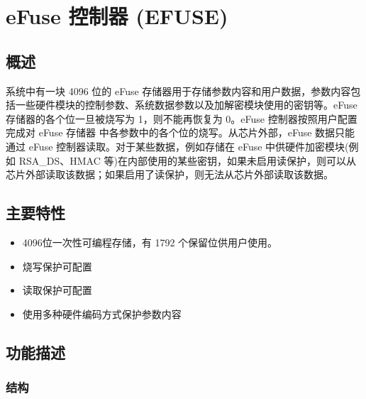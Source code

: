 \documentclass[main\_\_CN.tex]{subfiles}
\begin{document}

\ifglobal
\else
    {\let\clearpage\relax \listoftodos}
    {\let\clearpage\relax \listofdonetodos}
    \tableofcontents
\fi



\chapter{eFuse 控制器 (EFUSE)}
\label{mod:efuse}
\hypertarget{efuse}{}

\section{概述}

\chipname{} 系统中有一块 4096 位的 eFuse 存储器用于存储参数内容和用户数据，参数内容包括一些硬件模块的控制参数、系统数据参数以及加解密模块使用的密钥等。eFuse 存储器的各个位一旦被烧写为 1，则不能再恢复为 0。eFuse 控制器按照用户配置完成对 eFuse 存储器 中各参数中的各个位的烧写。从芯片外部，eFuse 数据只能通过 eFuse 控制器读取。对于某些数据，例如存储在 eFuse 中供硬件加密模块(例如 RSA\_DS、HMAC 等)在内部使用的某些密钥，如果未启用读保护，则可以从芯片外部读取该数据；如果启用了读保护，则无法从芯片外部读取该数据。


\section{主要特性}

\begin{itemize}
    \item 4096位一次性可编程存储，有 1792 个保留位供用户使用。
    \item 烧写保护可配置
    \item 读取保护可配置
    \item 使用多种硬件编码方式保护参数内容
\end{itemize}


\section{功能描述}

\subsection{结构}
\end{document}
